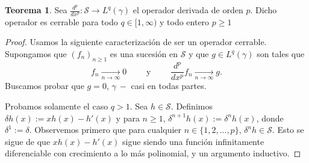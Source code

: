 \documentclass[letterpaper,twoside,12pt]{book}
\renewcommand{\S}{\mathcal{S}}
\newcommand{\1}{\mathds{1}}
\renewcommand{\to}{\rightarrow}
\theoremstyle{definition}
\theoremstyle{definition}
\newtheorem{teo}{Teorema}
\theoremstyle{remark}
\theoremstyle{definition}
\theoremstyle{definition}
\theoremstyle{definition}
\theoremstyle{definition}
\theoremstyle{definition}
\begin{document}
\begin{teo} 
Sea $\frac{d^{p}}{dx^p}:\mathcal{S}\longrightarrow L^{q}(\gamma)$ el operador derivada de orden $p$. Dicho operador es cerrable para todo $q\in [1,\infty)$ y todo entero $p\geq1$
\end{teo}
\begin{proof} 
  Usamos la siguiente caracterización de ser un operador cerrable. Supongamos que $(f_n)_{n\geq1}$ es una sucesión en $\S$ y que $g\in L^{q}(\gamma)$ son tales que 
  \[
  f_n\xrightarrow[n\to \infty]{}0 \qquad \text{ y } \qquad \frac{d^{p}}{dx^{p}}f_n\xrightarrow[n\to \infty]{}g.
  \] 
   Buscamos probar que $g=0$, $\gamma \ - $ casi en todas partes.
   
   Probamos solamente el caso $q>1$. Sea $h\in \S$. Definimos $\delta h(x):=xh(x)-h'(x)$ y para $n\geq1$, $\delta^{n+1}h(x):=\delta^{n} h(x)$, donde $\delta^{1}:=\delta$. Observemos primero que para cualquier $n\in \{1,2,...,p\}$, $\delta^{n}h\in \S$. Esto se sigue de que $xh(x)-h'(x)$ sigue siendo una función infinitamente diferenciable con crecimiento a lo más polinomial, y un argumento inductivo.
   

\end{proof}
\end{document}
